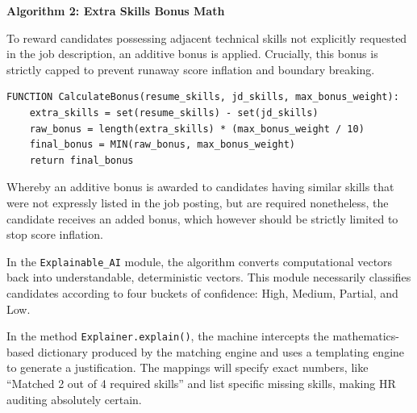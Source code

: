 \textbf{Algorithm 2: Extra Skills Bonus Math}

To reward candidates possessing adjacent technical skills not explicitly requested in the job description, an additive bonus is applied. Crucially, this bonus is strictly capped to prevent runaway score inflation and boundary breaking.

\begin{footnotesize}
\begin{verbatim}
FUNCTION CalculateBonus(resume_skills, jd_skills, max_bonus_weight):
    extra_skills = set(resume_skills) - set(jd_skills)
    raw_bonus = length(extra_skills) * (max_bonus_weight / 10)
    final_bonus = MIN(raw_bonus, max_bonus_weight)
    return final_bonus
\end{verbatim}
\end{footnotesize}

Whereby an additive bonus is awarded to candidates having similar skills that were not expressly listed in the job posting, but are required nonetheless, the candidate receives an added bonus, which however should be strictly limited to stop score inflation.

In the \texttt{Explainable\_AI} module, the algorithm converts computational vectors back into understandable, deterministic vectors. This module necessarily classifies candidates according to four buckets of confidence: High, Medium, Partial, and Low.

In the method \texttt{Explainer.explain()}, the machine intercepts the mathematics-based dictionary produced by the matching engine and uses a templating engine to generate a justification. The mappings will specify exact numbers, like “Matched 2 out of 4 required skills” and list specific missing skills, making HR auditing absolutely certain.
